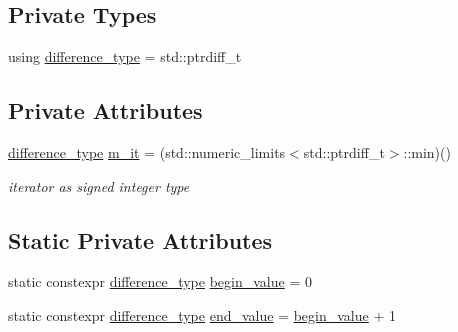 \subsection*{Private Types}
\begin{DoxyCompactItemize}
\item 
using \mbox{\hyperlink{classnlohmann_1_1detail_1_1primitive__iterator__t_af3db0d5c90de427d51645fe73a015553}{difference\+\_\+type}} = std\+::ptrdiff\+\_\+t
\end{DoxyCompactItemize}
\subsection*{Private Attributes}
\begin{DoxyCompactItemize}
\item 
\mbox{\hyperlink{classnlohmann_1_1detail_1_1primitive__iterator__t_af3db0d5c90de427d51645fe73a015553}{difference\+\_\+type}} \mbox{\hyperlink{classnlohmann_1_1detail_1_1primitive__iterator__t_a4357355113b0cd7e12b15c2e93703510}{m\+\_\+it}} = (std\+::numeric\+\_\+limits$<$std\+::ptrdiff\+\_\+t$>$\+::min)()
\begin{DoxyCompactList}\small\item\em iterator as signed integer type \end{DoxyCompactList}\end{DoxyCompactItemize}
\subsection*{Static Private Attributes}
\begin{DoxyCompactItemize}
\item 
static constexpr \mbox{\hyperlink{classnlohmann_1_1detail_1_1primitive__iterator__t_af3db0d5c90de427d51645fe73a015553}{difference\+\_\+type}} \mbox{\hyperlink{classnlohmann_1_1detail_1_1primitive__iterator__t_afcb3bcf9da8aa95bd82067d1a67c2326}{begin\+\_\+value}} = 0
\item 
static constexpr \mbox{\hyperlink{classnlohmann_1_1detail_1_1primitive__iterator__t_af3db0d5c90de427d51645fe73a015553}{difference\+\_\+type}} \mbox{\hyperlink{classnlohmann_1_1detail_1_1primitive__iterator__t_aa37c37da44f19e6ec1d7d4a9910511c7}{end\+\_\+value}} = \mbox{\hyperlink{classnlohmann_1_1detail_1_1primitive__iterator__t_afcb3bcf9da8aa95bd82067d1a67c2326}{begin\+\_\+value}} + 1
\end{DoxyCompactItemize}
